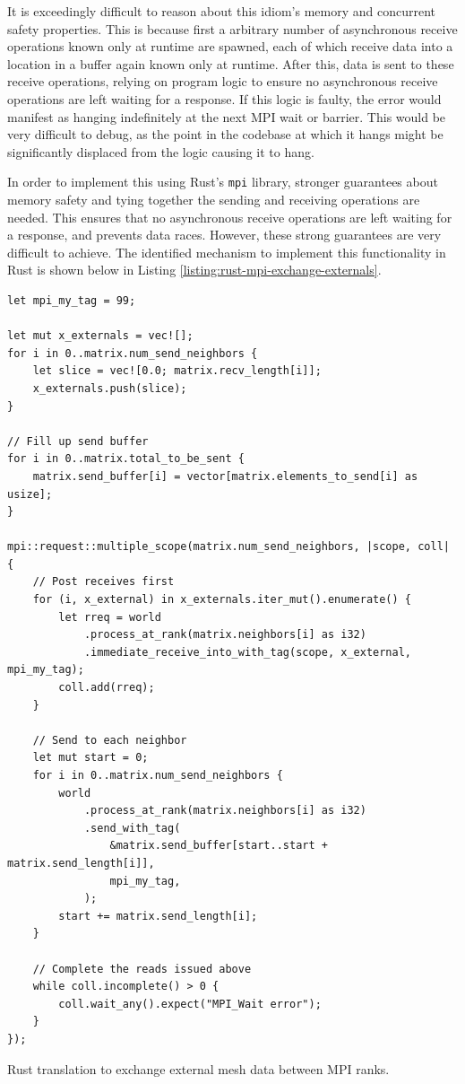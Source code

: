 It is exceedingly difficult to reason about this idiom's memory and concurrent safety properties. This is because first a arbitrary number of asynchronous receive operations known only at runtime are spawned, each of which receive data into a location in a buffer again known only at runtime. After this, data is sent to these receive operations, relying on program logic to ensure no asynchronous receive operations are left waiting for a response. If this logic is faulty, the error would manifest as hanging indefinitely at the next MPI wait or barrier. This would be very difficult to debug, as the point in the codebase at which it hangs might be significantly displaced from the logic causing it to hang.

In order to implement this using Rust's \texttt{mpi} library, stronger guarantees about memory safety and tying together the sending and receiving operations are needed. This ensures that no asynchronous receive operations are left waiting for a response, and prevents data races. However, these strong guarantees are very difficult to achieve. The identified mechanism to implement this functionality in Rust is shown below in Listing \ref{listing:rust-mpi-exchange-externals}.

\begin{code}
    \begin{verbatim}
let mpi_my_tag = 99;

let mut x_externals = vec![];
for i in 0..matrix.num_send_neighbors {
    let slice = vec![0.0; matrix.recv_length[i]];
    x_externals.push(slice);
}

// Fill up send buffer
for i in 0..matrix.total_to_be_sent {
    matrix.send_buffer[i] = vector[matrix.elements_to_send[i] as usize];
}

mpi::request::multiple_scope(matrix.num_send_neighbors, |scope, coll| {
    // Post receives first
    for (i, x_external) in x_externals.iter_mut().enumerate() {
        let rreq = world
            .process_at_rank(matrix.neighbors[i] as i32)
            .immediate_receive_into_with_tag(scope, x_external, mpi_my_tag);
        coll.add(rreq);
    }

    // Send to each neighbor
    let mut start = 0;
    for i in 0..matrix.num_send_neighbors {
        world
            .process_at_rank(matrix.neighbors[i] as i32)
            .send_with_tag(
                &matrix.send_buffer[start..start + matrix.send_length[i]],
                mpi_my_tag,
            );
        start += matrix.send_length[i];
    }
    
    // Complete the reads issued above
    while coll.incomplete() > 0 {
        coll.wait_any().expect("MPI_Wait error");
    }
});
    \end{verbatim}
    \caption{Rust translation to exchange external mesh data between MPI ranks.}
    \label{listing:rust-mpi-exchange-externals}
\end{code}

